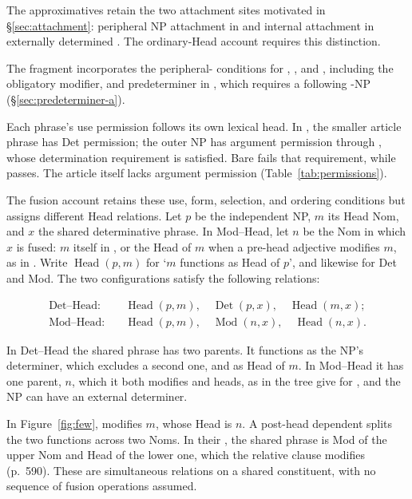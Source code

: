 \documentclass[12pt]{article}
\begin{document}
The approximatives retain the two attachment sites motivated in §\ref{sec:attachment}: peripheral NP attachment in  and internal attachment in externally determined . The ordinary-Head account requires this distinction.

The fragment incorporates the peripheral- conditions for , , and , including the obligatory modifier, and predeterminer  in , which requires a following -NP (§\ref{sec:predeterminer-a}).

Each phrase's use permission follows its own lexical head. In , the smaller article phrase has Det permission; the outer NP has argument permission through , whose determination requirement is satisfied. Bare  fails that requirement, while  passes. The article itself lacks argument permission (Table~\ref{tab:permissions}).

The fusion account retains these use, form, selection, and ordering conditions but assigns different Head relations. Let $p$ be the independent NP, $m$ its Head Nom, and $x$ the shared determinative phrase. In Mod--Head, let $n$ be the Nom in which $x$ is fused: $m$ itself in , or the Head of $m$ when a pre-head adjective modifies $m$, as in . Write $\operatorname{Head}(p,m)$ for \enquote*{$m$ functions as Head of $p$}, and likewise for Det and Mod. The two configurations satisfy the following relations:

\[
\begin{aligned}
\text{Det--Head:}\quad
 &\operatorname{Head}(p,m),\quad \operatorname{Det}(p,x),\quad \operatorname{Head}(m,x); \\
\text{Mod--Head:}\quad
 &\operatorname{Head}(p,m),\quad \operatorname{Mod}(n,x),\quad \operatorname{Head}(n,x).
\end{aligned}
\]

In Det--Head the shared phrase has two parents. It functions as the NP's determiner, which excludes a second one, and as Head of $m$. In Mod--Head it has one parent, $n$, which it both modifies and heads, as in the tree \textcite[588]{Payne2007} give for , and the NP can have an external determiner.

In Figure~\ref{fig:few},  modifies $m$, whose Head is $n$. A post-head dependent splits the two functions across two Noms. In their , the shared phrase is Mod of the upper Nom and Head of the lower one, which the relative clause modifies (p.~590). These are simultaneous relations on a shared constituent, with no sequence of fusion operations assumed.
\end{document}

